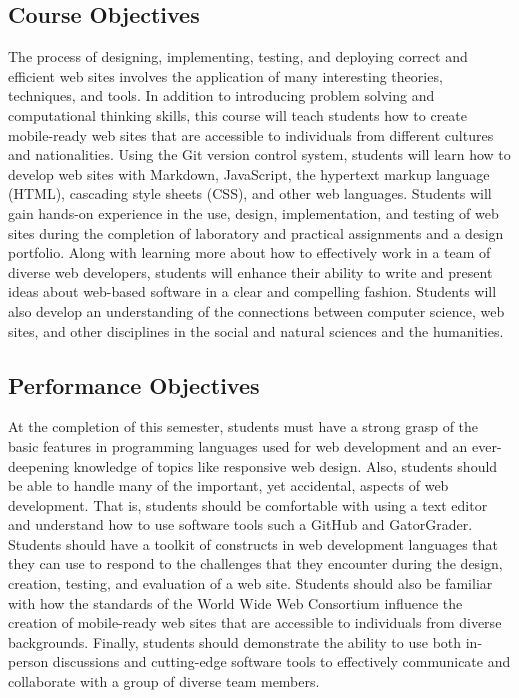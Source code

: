 \documentclass[11pt]{article}
\begin{document}
\subsection*{Course Objectives}

The process of designing, implementing, testing, and deploying correct and
efficient web sites involves the application of many interesting theories,
techniques, and tools. In addition to introducing problem solving and
computational thinking skills, this course will teach students how to create
mobile-ready web sites that are accessible to individuals from different
cultures and nationalities. Using the Git version control system, students will
learn how to develop web sites with Markdown, JavaScript, the hypertext markup
language (HTML), cascading style sheets (CSS), and other web languages.
%
Students will gain hands-on experience in the use, design, implementation, and
testing of web sites during the completion of laboratory and practical
assignments and a design portfolio. Along with learning more about how to
effectively work in a team of diverse web developers, students will enhance
their ability to write and present ideas about web-based software in a clear and
compelling fashion. Students will also develop an understanding of the
connections between computer science, web sites, and other disciplines in the
social and natural sciences and the humanities.

\subsection*{Performance Objectives}

At the completion of this semester, students must have a strong grasp of the
basic features in programming languages used for web development and an
ever-deepening knowledge of topics like responsive web design. Also, students
should be able to handle many of the important, yet accidental, aspects of web
development. That is, students should be comfortable with using a text editor
and understand how to use software tools such a GitHub and GatorGrader. Students
should have a toolkit of constructs in web development languages that they can
use to respond to the challenges that they encounter during the design,
creation, testing, and evaluation of a web site. Students should also be
familiar with how the standards of the World Wide Web Consortium influence the
creation of mobile-ready web sites that are accessible to individuals from
diverse backgrounds. Finally, students should demonstrate the ability to use
both in-person discussions and cutting-edge software tools to effectively
communicate and collaborate with a group of diverse team members.
\end{document}
